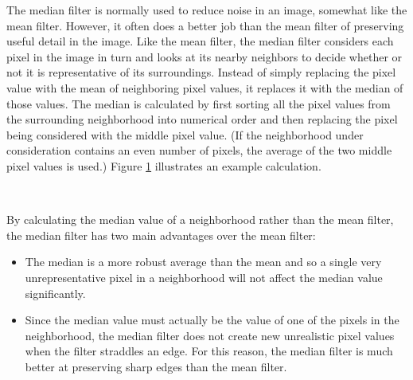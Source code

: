\documentclass[12pt,fleqn]{book} %
\begin{document}
The median filter is normally used to 
reduce noise in an image, somewhat 
like the mean filter. However, it often 
does a better job than the mean filter 
of preserving useful detail in the 
image. Like the mean filter, the 
median filter considers each pixel in 
the image in turn and looks at its 
nearby neighbors to decide whether or 
not it is representative of its 
surroundings. Instead of simply replacing the pixel value with the mean of neighboring pixel 
values, it replaces it with the median of those values. The median is calculated by first sorting 
all the pixel values from the surrounding neighborhood into numerical order and then replacing 
the pixel being considered with the middle pixel value. (If the neighborhood under consideration 
contains an even number of pixels, the average of the two middle pixel values is used.) Figure \ref{fig:fig7}
illustrates an example calculation.

\begin{figure}[h]
\begin{dBox}
\centering
\mbox{
   }
   \caption{
   \label{fig:fig7} }   
\end{dBox}   
\end{figure}
\bigskip

By calculating the median value of a neighborhood rather than the mean filter, the median filter 
has two main advantages over the mean filter: 
\begin{itemize}
\item The median is a more robust average than the mean and so a single very 
unrepresentative pixel in a neighborhood will not affect the median value significantly. 
\item Since the median value must actually be the value of one of the pixels in the 
neighborhood, the median filter does not create new unrealistic pixel values when the 
filter straddles an edge. For this reason, the median filter is much better at preserving 
sharp edges than the mean filter.
\end{itemize}
\end{document}
